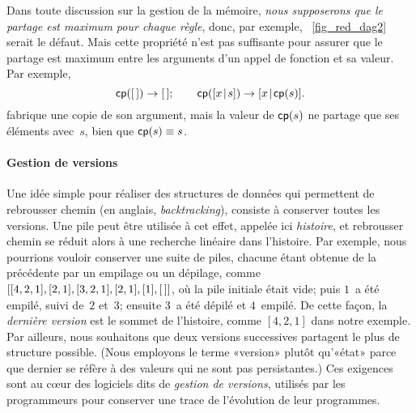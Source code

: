 
Dans toute discussion sur la gestion de la mémoire, \emph{nous
  supposerons que le partage est maximum pour chaque règle}, donc, par
exemple, \fig~\vref{fig_red_dag2} serait le défaut. Mais cette
propriété n'est pas suffisante pour assurer que le partage est maximum
entre les arguments d'un appel de fonction et sa valeur. Par exemple,
\begin{equation*}
\textsf{cp}([\,]) \rightarrow [\,];\qquad
\textsf{cp}([{x}\!\mid\!{s}]) \rightarrow [{x}\!\mid\!{\textsf{cp}(s)}].
\end{equation*}
fabrique une copie de son argument, mais la valeur de \(\textsf{cp}(s)\)
ne partage que ses éléments avec~\(s\), bien que \(\textsf{cp}(s) \equiv
s\).

\paragraph{Gestion de versions}

Une idée simple pour réaliser des structures de données qui permettent
de rebrousser chemin (en anglais, \emph{backtracking}), consiste à
conserver toutes les versions. Une pile peut être utilisée à cet effet, appelée ici
\emph{histoire}, et rebrousser chemin se
réduit alors à une recherche linéaire dans
l'histoire. Par exemple, nous pourrions vouloir conserver une suite de
piles, chacune étant obtenue de la précédente par un empilage ou un
dépilage, comme \([[4,2,1],[2,1],[3,2,1],[2,1],[1],[\,]]\),
où la pile initiale était vide; puis \(1\)~a été empilé, suivi
de~\(2\) et~\(3\); ensuite \(3\)~a été dépilé et \(4\)~empilé. De
cette façon, la \emph{dernière version} est le sommet de l'histoire,
comme \([4,2,1]\) dans notre exemple. Par ailleurs, nous souhaitons
que deux versions successives partagent le plus de structure
possible. (Nous employons le terme «version» plutôt qu'«état» parce
que dernier se réfère à des valeurs qui ne sont pas persistantes.) Ces
exigences sont au c{\oe}ur des logiciels dits de \emph{gestion de
  versions}, utilisés par les programmeurs pour conserver une trace de
l'évolution de leur programmes.

